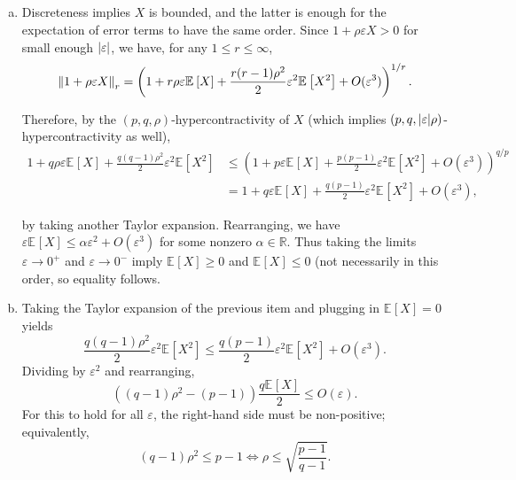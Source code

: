 \documentclass[12pt]{article}
\newcommand{\eps}{\varepsilon}
\newcommand{\E}[2][]{\mathbb E_{#1}\left[#2\right]}
\newcommand{\R}{\mathbb R}
\newcommand{\eqn}[1]{\begin{equation*}#1\end{equation*}}
\begin{document}
\subsection{}
\begin{enumerate}[(a)]
    \item Discreteness implies $X$ is bounded, and the latter is enough for the expectation of error terms to have the same order. Since $1 + \rho \eps X > 0$ for small enough $\abs{\eps}$, we have, for any $1 \leq r \leq \infty$,
    \eqn{\norm{1 + \rho \eps X}_r = \left(1 + r \rho \eps \E{X} + \frac{r (r - 1) \rho^2}{2} \eps^2 \E{X^2} + O(\eps^3)\right)^{1/r}.}
    
    Therefore, by the $(p,q,\rho)$-hypercontractivity of $X$ (which implies $(p,q,\abs{\eps} \rho)$-hypercontractivity as well),
    \begin{align*}
        1 + q \rho \eps \E{X} + \frac{q (q - 1) \rho^2}{2} \eps^2 \E{X^2} &\leq \left(1 + p \eps \E{X} + \frac{p (p - 1)}{2} \eps^2 \E{X^2} + O(\eps^3)\right)^{q/p}\\
        &=  1 + q \eps \E{X} + \frac{q (p - 1)}{2} \eps^2 \E{X^2} +  O(\eps^3),
    \end{align*}
    
    by taking another Taylor expansion. Rearranging, we have $\eps \E{X} \leq \alpha \eps^2 + O(\eps^3)$ for some nonzero $\alpha \in \R$. Thus taking the limits $\eps \to 0^+$ and $\eps \to 0^-$ imply $\E{X} \geq 0$ and $\E{X} \leq 0$ (not necessarily in this order, so equality follows.
    
    \item Taking the Taylor expansion of the previous item and plugging in $\E{X} = 0$ yields
    \eqn{\frac{q (q - 1) \rho^2}{2} \eps^2 \E{X^2} \leq \frac{q (p - 1)}{2} \eps^2 \E{X^2} +  O(\eps^3).}
    Dividing by $\eps^2$ and rearranging,
    \eqn{\left((q - 1)\rho^2 - (p - 1)\right) \frac{q \E{X}}{2} \leq O(\eps).}
    For this to hold for all $\eps$, the right-hand side must be non-positive; equivalently,
    \eqn{(q - 1) \rho^2 \leq p - 1 \iff \rho \leq \sqrt{\frac{p - 1}{q - 1}}.} 
\end{enumerate}
\end{document}
